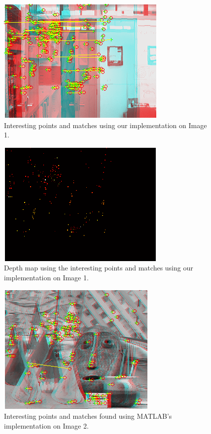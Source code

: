 \begin{figure}[H]\centering
	\includegraphics[width=0.8\linewidth]{Images/01_our_match.png}
	\caption{Interesting points and matches using our implementation on Image 1.}
	\label{fig:grid-example}
\end{figure}

\begin{figure}[H]\centering
	\includegraphics[width=0.8\linewidth]{Images/01_our_depth.png}
	\caption{Depth map using the interesting points and matches using our implementation on Image 1.}
	\label{fig:grid-example}
\end{figure}

\begin{figure}[H]\centering
	\includegraphics[width=0.8\linewidth]{Images/02_matlab_match.png}
	\caption{Interesting points and matches found using MATLAB's implementation on Image 2.}
	\label{fig:grid-example}
\end{figure}

